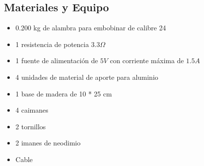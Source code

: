 \subsection{Materiales y Equipo}
\begin{multicols}{2}
\begin{itemize}
 \item 0.200 kg de alambra para embobinar de calibre 24
 \item 1 resistencia de potencia  $3.3 \Omega$
 \item 1 fuente de alimentaci\'on de $5 V$ con corriente m\'axima de $1.5 A$
 \item 4 unidades de material de aporte para aluminio
 \item 1 base de madera de 10 * 25 cm
 \item 4 caimanes
 \item 2 tornillos
 \item 2 imanes de neodimio
 \item Cable
\end{itemize}
\end{multicols}
